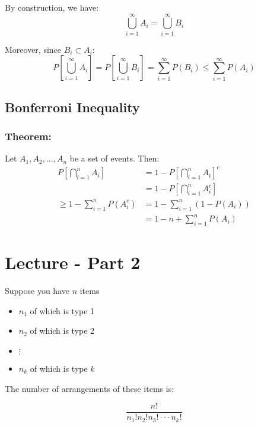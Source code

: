 \documentclass{article}
\begin{document}
By construction, we have:
\begin{equation*}
    \bigcup_{i=1}^\infty A_i = \bigcup_{i=1}^\infty B_i
\end{equation*}

Moreover, since $B_i \subset A_i$:
\begin{equation*}
    P\left[\bigcup_{i=1}^\infty A_i  \right] = P\left[\bigcup_{i=1}^\infty B_i  \right] = \sum_{i=1}^\infty P(B_i) \leq \sum_{i=1}^\infty P(A_i)
\end{equation*}

\subsection{Bonferroni Inequality}
\subsubsection*{Theorem:}

Let $A_1,A_2,...,A_n$ be a set of events. Then:
\begin{equation*}
    \begin{split}
        P\left[\bigcap_{i=1}^n A_i \right] &= 1 - P \left[\bigcap_{i=1}^n A_i \right]^c\\
        &= 1 -  P \left[\bigcap_{i=1}^n A_i^c \right]\\
        \geq 1 - \sum_{i=1}^n P(A_i^c) &= 1 - \sum_{i=1}^n (1 - P(A_i))\\
                                        &= 1 - n + \sum_{i=1}^n P(A_i)
    \end{split}
\end{equation*}

\section{Lecture - Part 2}

Suppose you have $n$ items
\begin{itemize}
    \item $n_1$ of which is type 1
    \item $n_2$ of which is type 2
    \item $\vdots$
    \item $n_k$ of which is type $k$
\end{itemize}

The number of arrangements of these items is:

\begin{equation*}
    \frac{n!}{n_1! n_2! n_3! \cdot\cdot\cdot n_k!}
\end{equation*}
\end{document}

